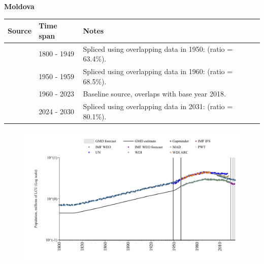 \documentclass[12pt,a4paper,landscape]{article}
\begin{document}
\begin{adjustbox}{max totalsize={\paperwidth}{\paperheight},center}
\begin{minipage}[t][\textheight][t]{\textwidth}
\vspace*{0.5cm}
{}
\begin{center}
{\Large\bfseries Moldova}
\end{center}
\vspace{0.5cm}
\begin{table}[H]
\centering
\small
\begin{tabular}{|l|l|l|}
\hline
\textbf{Source} & \textbf{Time span} & \textbf{Notes} \\
\hline
\rowcolor{white}\cite{Gapminder}& 1800 - 1949 &Spliced using overlapping data in 1950: (ratio = 63.4\%).\\
\rowcolor{lightgray}\cite{IMF_IFS}& 1950 - 1959 &Spliced using overlapping data in 1960: (ratio = 68.5\%).\\
\rowcolor{white}\cite{WDI}& 1960 - 2023 &Baseline source, overlaps with base year 2018.\\
\rowcolor{lightgray}\cite{Gapminder}& 2024 - 2030 &Spliced using overlapping data in 2031: (ratio = 80.1\%).\\
\hline
\end{tabular}
\end{table}
\begin{figure}[H]
\centering
\includegraphics[width=\textwidth,height=0.6\textheight,keepaspectratio]{graphs/MDA_pop.pdf}
\end{figure}
\end{minipage}
\end{adjustbox}
\end{document}
